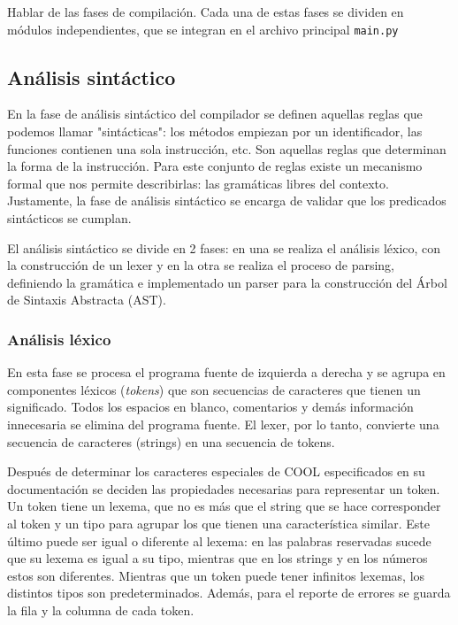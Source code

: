 \documentclass[11pt]{scrartcl} %
\begin{document}
Hablar de las fases de compilación. Cada una de estas fases se dividen en módulos independientes, que se integran en el archivo principal \texttt{main.py}

\subsection{Análisis sintáctico}

En la fase de análisis sintáctico del compilador se definen aquellas reglas que podemos llamar "sintácticas": los métodos empiezan por un identificador, las funciones contienen una sola instrucción, etc. Son aquellas reglas que determinan la forma de la instrucción. Para este conjunto de reglas existe un mecanismo formal que nos permite describirlas: las gramáticas libres del contexto. Justamente, la fase de análisis sintáctico se encarga de validar que los predicados sintácticos se cumplan.

El análisis sintáctico se divide en 2 fases: en una se realiza el análisis léxico, con la construcción de un lexer y en la otra se realiza el proceso de parsing, definiendo la gramática e implementado un parser para la construcción del Árbol de Sintaxis Abstracta (AST).

\subsubsection{Análisis léxico}

En esta fase se procesa el programa fuente de izquierda a derecha y se agrupa en componentes léxicos (\textit{tokens}) que son secuencias de caracteres que tienen un significado. Todos los espacios en blanco, comentarios y demás información innecesaria se elimina del programa fuente. El lexer, por lo tanto, convierte una secuencia de caracteres (strings) en una secuencia de tokens.

Después de determinar los caracteres especiales de COOL especificados en su documentación se deciden las propiedades necesarias para representar un token. Un token tiene un lexema, que no es más que el string que se hace corresponder al token y un tipo para agrupar los que tienen una característica similar. Este último puede ser igual o diferente al lexema: en las palabras reservadas sucede que su lexema es igual a su tipo, mientras que en los strings y en los números estos son diferentes. Mientras que un token puede tener infinitos lexemas, los distintos tipos son predeterminados. Además, para el reporte de errores se guarda la fila y la columna de cada token.
\end{document}
